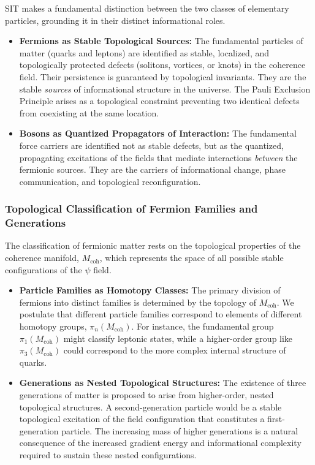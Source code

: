 SIT makes a fundamental distinction between the two classes of elementary particles, grounding it in their distinct informational roles.
\begin{itemize}
    \item \textbf{Fermions as Stable Topological Sources:} The fundamental particles of matter (quarks and leptons) are identified as stable, localized, and topologically protected defects (solitons, vortices, or knots) in the coherence field. Their persistence is guaranteed by topological invariants. They are the stable \emph{sources} of informational structure in the universe. The Pauli Exclusion Principle arises as a topological constraint preventing two identical defects from coexisting at the same location.

    \item \textbf{Bosons as Quantized Propagators of Interaction:} The fundamental force carriers are identified not as stable defects, but as the quantized, propagating excitations of the fields that mediate interactions \emph{between} the fermionic sources. They are the carriers of informational change, phase communication, and topological reconfiguration.
\end{itemize}

\subsubsection{Topological Classification of Fermion Families and Generations}

The classification of fermionic matter rests on the topological properties of the coherence manifold, $M_{\text{coh}}$, which represents the space of all possible stable configurations of the $\psi$ field.

\begin{itemize}
    \item \textbf{Particle Families as Homotopy Classes:} The primary division of fermions into distinct families is determined by the topology of $M_{\text{coh}}$. We postulate that different particle families correspond to elements of different homotopy groups, $\pi_n(M_{\text{coh}})$. For instance, the fundamental group $\pi_1(M_{\text{coh}})$ might classify leptonic states, while a higher-order group like $\pi_3(M_{\text{coh}})$ could correspond to the more complex internal structure of quarks.

    \item \textbf{Generations as Nested Topological Structures:} The existence of three generations of matter is proposed to arise from higher-order, nested topological structures. A second-generation particle would be a stable topological excitation of the field configuration that constitutes a first-generation particle. The increasing mass of higher generations is a natural consequence of the increased gradient energy and informational complexity required to sustain these nested configurations.
\end{itemize}

